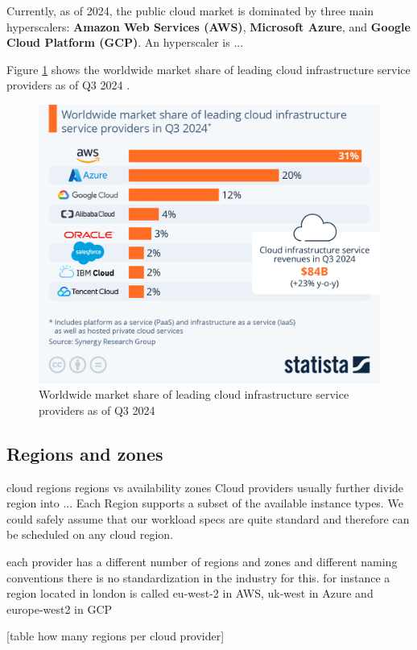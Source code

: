 Currently, as of 2024, the public cloud market is dominated by three main hyperscalers: \textbf{Amazon Web Services (AWS)}, \textbf{Microsoft Azure}, and \textbf{Google Cloud Platform (GCP)}.
An hyperscaler is ...

Figure \ref{fig:pcp} shows the worldwide market share of leading cloud infrastructure service providers as of Q3 2024 \cite{statista}.

\begin{figure}[htbp]
    \centering
    \includegraphics[width=0.75\linewidth]{images/pcp.jpeg}
    \caption{Worldwide market share of leading cloud infrastructure service providers as of Q3 2024 \cite{statista}}
    \label{fig:pcp}
\end{figure}
  




\subsection{Regions and zones}
cloud regions
regions vs availability zones
Cloud providers usually further divide region into ...
Each Region supports a subset of the available instance types.
We could safely assume that our workload specs are quite standard and therefore can be scheduled on any cloud region.

each provider has a different number of regions and zones and different naming conventions
there is no standardization in the industry for this. 
for instance a region located in london is called eu-west-2 in AWS, uk-west in Azure and europe-west2 in GCP

[table how many regions per cloud provider]

